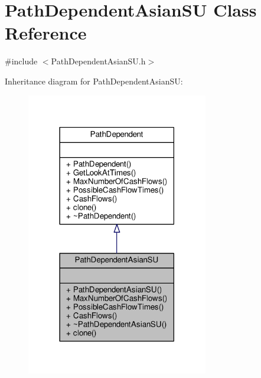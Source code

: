 \hypertarget{classPathDependentAsianSU}{}\section{Path\+Dependent\+Asian\+SU Class Reference}
\label{classPathDependentAsianSU}


{\ttfamily \#include $<$Path\+Dependent\+Asian\+S\+U.\+h$>$}



Inheritance diagram for Path\+Dependent\+Asian\+SU\+:
\nopagebreak
\begin{figure}[H]
\begin{center}
\leavevmode
\includegraphics[width=225pt]{classPathDependentAsianSU__inherit__graph}
\end{center}
\end{figure}


